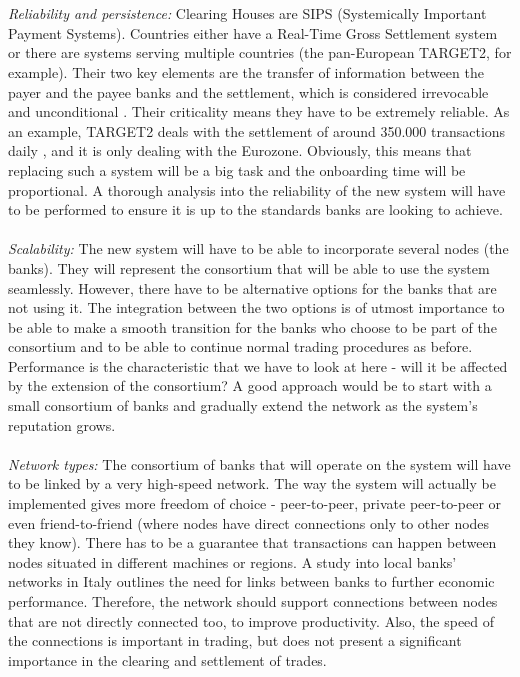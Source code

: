 \documentclass[12pt,twoside]{article}
\begin{document}
\\ \\
\textit{Reliability and persistence:} Clearing Houses are SIPS (Systemically Important Payment Systems). Countries either have a Real-Time Gross Settlement system or there are systems serving multiple countries (the pan-European TARGET2, for example). Their two key elements are the transfer of information between the payer and the payee banks and the settlement, which is considered irrevocable and unconditional \cite{RTGS}. Their criticality means they have to be extremely reliable. As an example, TARGET2 deals with the settlement of around 350.000 transactions daily \cite{TARGET2}, and it is only dealing with the Eurozone. Obviously, this means that replacing such a system will be a big task and the onboarding time will be proportional. A thorough analysis into the reliability of the new system will have to be performed to ensure it is up to the standards banks are looking to achieve.
\\ \\
\textit{Scalability:} The new system will have to be able to incorporate several nodes (the banks). They will represent the consortium that will be able to use the system seamlessly. However, there have to be alternative options for the banks that are not using it. The integration between the two options is of utmost importance to be able to make a smooth transition for the banks who choose to be part of the consortium and to be able to continue normal trading procedures as before. Performance is the characteristic that we have to look at here - will it be affected by the extension of the consortium? A good approach would be to start with a small consortium of banks and gradually extend the network as the system's reputation grows.
\\ \\
\textit{Network types:} The consortium of banks that will operate on the system will have to be linked by a very high-speed network. The way the system will actually be implemented gives more freedom of choice - peer-to-peer, private peer-to-peer or even friend-to-friend (where nodes have direct connections only to other nodes they know). There has to be a guarantee that transactions can happen between nodes situated in different machines or regions. A study into local banks' networks in Italy \cite{Italy:networks} outlines the need for links between banks to further economic performance. Therefore, the network should support connections between nodes that are not directly connected too, to improve productivity. Also, the speed of the connections is important in trading, but does not present a significant importance in the clearing and settlement of trades. 
\end{document}
